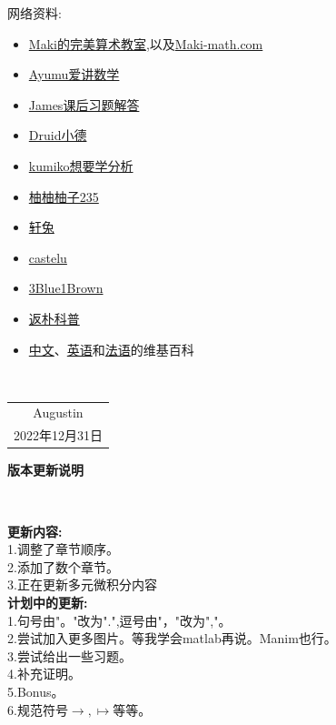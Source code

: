 \documentclass[12pt, a4paper, oneside]{ctexbook}
\begin{document}
网络资料:
\begin{itemize}
  \item \href{https://space.bilibili.com/391930545}{Maki的完美算术教室},以及\href{https://www.maki-math.com/#/}{Maki-math.com}
  \item \href{https://space.bilibili.com/1632276842}{Ayumu爱讲数学}
  \item \href{https://space.bilibili.com/29977151}{James课后习题解答}
  \item \href{https://space.bilibili.com/6073855}{Druid小德}
  \item \href{https://space.bilibili.com/3156848}{kumiko想要学分析}
  \item \href{https://space.bilibili.com/586867165}{柚柚柚子235}
  \item \href{https://space.bilibili.com/20883932}{轩兔}
  \item \href{https://space.bilibili.com/184538069}{castelu}
  \item \href{https://space.bilibili.com/88461692}{3Blue1Brown}
  \item \href{https://space.bilibili.com/415941398}{返朴科普}
  \item \href{https://zh.wikipedia.org/wiki/Wikipedia:%E9%A6%96%E9%A1%B5}{中文}、\href{https://en.wikipedia.org/wiki/Main_Page}{英语}和\href{https://fr.wikipedia.org/wiki/Wikip%C3%A9dia:Accueil_principal}{法语}的维基百科
\end{itemize}


~\\
\begin{flushright}
    \begin{tabular}{c}
        Augustin\\
        2022年12月31日
    \end{tabular}
\end{flushright}


\newpage
\begin{center}
  \Huge\textbf{版本更新说明}
\end{center}~\


\noindent
\textbf{更新内容:}\\
1.调整了章节顺序。\\
2.添加了数个章节。\\
3.正在更新多元微积分内容\\

\noindent
\textbf{计划中的更新:}\\
1.句号由"。"改为".",逗号由"，"改为","。\\
2.尝试加入更多图片。等我学会matlab再说。Manim也行。\\
3.尝试给出一些习题。\\
4.补充证明。\\
5.Bonus。\\
6.规范符号$\rightarrow,\mapsto $等等。
\end{document}
